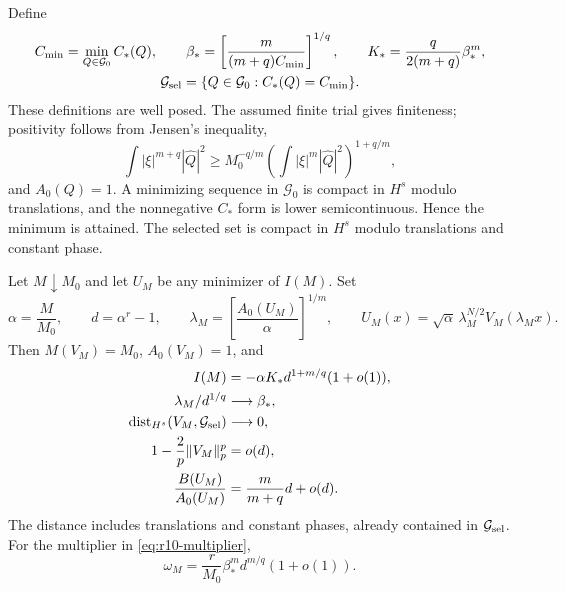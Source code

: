 Define
\begin{equation}\label{eq:r10-selection-constants}
 \begin{gathered}
 C_{\min}=\min_{Q\in\mathcal G_0}C_*(Q),\qquad
 \beta_* =\left[\frac{m}{(m+q)C_{\min}}\right]^{1/q},\qquad
 K_* =\frac{q}{2(m+q)}\beta_*^m,\\
 \mathcal G_{\rm sel}=\{Q\in\mathcal G_0:C_*(Q)=C_{\min}\}.
 \end{gathered}
\end{equation}
These definitions are well posed. The assumed finite trial gives
finiteness; positivity follows from Jensen's inequality,
\[
 \int|\xi|^{m+q}|\widehat Q|^2
 \ge M_0^{-q/m}\left(\int|\xi|^m|\widehat Q|^2\right)^{1+q/m},
\]
and $A_0(Q)=1$. A minimizing sequence in $\mathcal G_0$ is compact in
$H^s$ modulo translations, and the nonnegative $C_*$ form is lower
semicontinuous. Hence the minimum is attained. The selected set is
compact in $H^s$ modulo translations and constant phase.

\begin{theorem}
\label{thm:r10-selection}
Let $M\downarrow M_0$ and let $U_M$ be any minimizer of $I(M)$. Set
\begin{equation}\label{eq:r10-normalization}
 \alpha=\frac{M}{M_0},\qquad d=\alpha^r-1,\qquad
 \lambda_M=\left[\frac{A_0(U_M)}{\alpha}\right]^{1/m},\qquad
 U_M(x)=\sqrt\alpha\,\lambda_M^{N/2}V_M(\lambda_Mx).
\end{equation}
Then $M(V_M)=M_0$, $A_0(V_M)=1$, and
\begin{align}
 I(M)&=-\alpha K_*d^{1+m/q}(1+o(1)),\label{eq:r10-energy-law}\\
 \lambda_M/d^{1/q}&\longrightarrow\beta_*,\label{eq:r10-scale-law}\\
 \operatorname{dist}_{H^s}(V_M,\mathcal G_{\rm sel})&\longrightarrow0,
       \label{eq:r10-shape-law}\\
 1-\frac2p\|V_M\|_p^p&=o(d),\label{eq:r10-deficit-law}\\
 \frac{B(U_M)}{A_0(U_M)}&=\frac{m}{m+q}d+o(d).
       \label{eq:r10-equipartition-law}
\end{align}
The distance includes translations and constant phases, already
contained in $\mathcal G_{\rm sel}$. For the multiplier in
\eqref{eq:r10-multiplier},
\begin{equation}\label{eq:r10-frequency-law}
 \omega_M=\frac{r}{M_0}\beta_*^m d^{m/q}(1+o(1)).
\end{equation}
\end{theorem}

